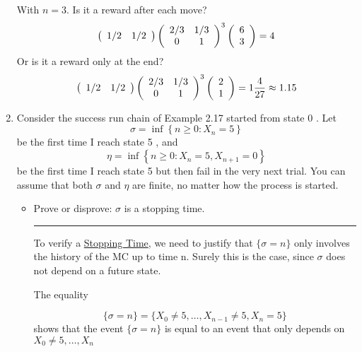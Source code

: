 \documentclass{article} %
\theoremstyle{plain}
\theoremstyle{case}
\begin{document}
\begin{enumerate}[label={\fbox{\textbf{Exercise \#\arabic* :}}}]
With $n=3$.  Is it a reward after each move?
  \[
      \left(
      \begin{array}{cc}
        1/2 & 1/2 \\
      \end{array}
     \right)
%
      \left(
        \begin{array}{c c}
          2/3 & 1/3 \\
          0   & 1 
        \end{array}
      \right)^3
%
      \left(
        \begin{array}{c}
        6 \\
        3 
        \end{array}
      \right) = 4
\]
Or is it a reward only at the end?
  \[
      \left(
      \begin{array}{cc}
        1/2 & 1/2 \\
      \end{array}
     \right)
%
      \left(
        \begin{array}{c c}
          2/3 & 1/3 \\
          0   & 1 
        \end{array}
      \right)^3
      \left(
        \begin{array}{c}
        2 \\
        1 
        \end{array}
      \right) = 1 \frac{4}{27} \approx 1.15
      \]

\newpage

  \item Consider the success run chain of Example 2.17 started from state 0 . Let
$$
\sigma=\inf \left\{n \geq 0: X_n=5\right\}
$$
be the first time I reach state 5 , and
$$
\eta=\inf \left\{n \geq 0: X_n=5, X_{n+1}=0\right\}
$$
be the first time I reach state 5 but then fail in the very next trial. You can assume that both $\sigma$ and $\eta$ are finite, no matter how the process is started.
  \begin{itemize}
	\item  Prove or disprove: $\sigma$ is a stopping time.
\par\noindent\rule{\textwidth}{0.1pt}

     To verify a \underline{Stopping Time},  we need to justify that
     $\{\sigma=n\}$ only involves the history of the MC up to time n.
     Surely this is the case, since $\sigma$ does not depend on
     a future state.

     The equality

     \[ \{ \sigma = n \} = \{X_0 \neq 5, \dots, X_{n-1} \neq 5, X_n=5 \} \]
     shows that the event $\{\sigma = n\}$ is equal to an event that 
     only depends on $X_0 \neq 5, \dots, X_{n} $


\end{itemize}
\end{enumerate}
\end{document}
